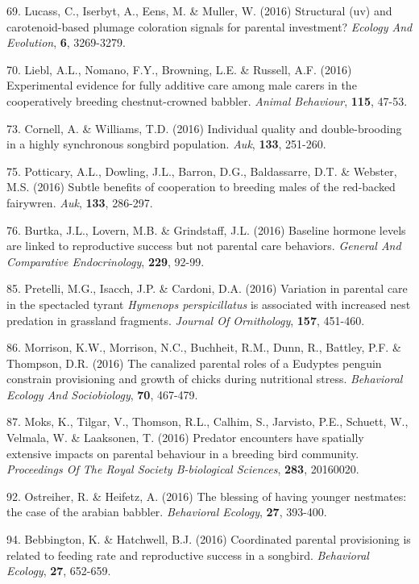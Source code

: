 69. Lucass, C., Iserbyt, A., Eens, M. \&  Muller, W. (2016) Structural (uv) and carotenoid-based plumage coloration signals for parental investment? \textit{Ecology And Evolution},  \textbf{6}, 3269-3279.

70. Liebl, A.L., Nomano, F.Y., Browning, L.E. \&  Russell, A.F. (2016) Experimental evidence for fully additive care among male carers in the cooperatively breeding chestnut-crowned babbler. \textit{Animal Behaviour},  \textbf{115}, 47-53.

73. Cornell, A. \&  Williams, T.D. (2016) Individual quality and double-brooding in a highly synchronous songbird population. \textit{Auk},  \textbf{133}, 251-260.

75. Potticary, A.L., Dowling, J.L., Barron, D.G., Baldassarre, D.T. \&  Webster, M.S. (2016) Subtle benefits of cooperation to breeding males of the red-backed fairywren. \textit{Auk},  \textbf{133}, 286-297.

76. Burtka, J.L., Lovern, M.B. \&  Grindstaff, J.L. (2016) Baseline hormone levels are linked to reproductive success but not parental care behaviors. \textit{General And Comparative Endocrinology},  \textbf{229}, 92-99.

85. Pretelli, M.G., Isacch, J.P. \&  Cardoni, D.A. (2016) Variation in parental care in the spectacled tyrant \textit{Hymenops perspicillatus} is associated with increased nest predation in grassland fragments. \textit{Journal Of Ornithology},  \textbf{157}, 451-460.

86. Morrison, K.W., Morrison, N.C., Buchheit, R.M., Dunn, R., Battley, P.F. \&  Thompson, D.R. (2016) The canalized parental roles of a Eudyptes penguin constrain provisioning and growth of chicks during nutritional stress. \textit{Behavioral Ecology And Sociobiology},  \textbf{70}, 467-479.

87. Moks, K., Tilgar, V., Thomson, R.L., Calhim, S., Jarvisto, P.E., Schuett, W., Velmala, W. \&  Laaksonen, T. (2016) Predator encounters have spatially extensive impacts on parental behaviour in a breeding bird community. \textit{Proceedings Of The Royal Society B-biological Sciences},  \textbf{283}, 20160020.

92. Ostreiher, R. \&  Heifetz, A. (2016) The blessing of having younger nestmates: the case of the arabian babbler. \textit{Behavioral Ecology},  \textbf{27}, 393-400.

94. Bebbington, K. \&  Hatchwell, B.J. (2016) Coordinated parental provisioning is related to feeding rate and reproductive success in a songbird. \textit{Behavioral Ecology},  \textbf{27}, 652-659.

